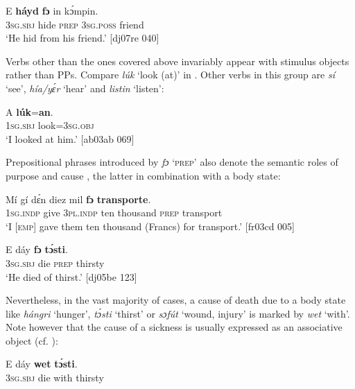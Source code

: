 \ea%
    \label{ex:key:1057}
    \gll E    \textbf{háyd}  \textbf{fɔ} in    kɔ́mpin.\\
\textsc{3sg.sbj}  hide    \textsc{prep}  \textsc{3sg.poss}  friend\\

\glt ‘He hid from his friend.’ [dj07re 040]
\z

Verbs other than the ones covered above invariably appear with stimulus objects rather than PPs. Compare \textit{lúk} ‘look (at)’ in . Other verbs in this group are \textit{sí} ‘see’, \textit{hía/yɛ́r} ‘hear’ and \textit{listin} ‘listen’:


\ea%
    \label{ex:key:1058}
    \gll A    \textbf{lúk}=\textbf{an}.\\
\textsc{1sg.sbj}  look=\textsc{3sg.obj}\\

\glt ‘I looked at him.’ [ab03ab 069]
\z

Prepositional phrases introduced by \textit{fɔ} ‘\textsc{prep}’ also denote the semantic roles of purpose  and cause , the latter in combination with a body state: 


\ea%
    \label{ex:key:1059}
    \gll Mí    gí  dɛ́n    diez  mil      \textbf{fɔ}  \textbf{transporte}.\\
\textsc{1sg.indp}  give  \textsc{3pl.indp}  ten  thousand  \textsc{prep}  transport\\

\glt ‘I \textsc{[emp]} gave them ten thousand (Francs) for transport.’ [fr03cd 005]
\z


\ea
	\label{ex:key:1060}
	\gll  E    dáy  \textbf{fɔ}  \textbf{tɔ́sti}.\\
\textsc{3sg.sbj}  die  \textsc{prep}  thirsty\\

\glt ‘He died of thirst.’ [dj05be 123]
\z

Nevertheless, in the vast majority of cases, a cause of death due to a body state like \textit{hángri} ‘hunger’, \textit{tɔ́sti} ‘thirst’  or \textit{sɔfút} ‘wound, injury’  is marked by \textit{wet} ‘with’. Note however that the cause of a sickness is usually expressed as an associative object (cf. ):


\ea%
    \label{ex:key:1061}
    \gll E    dáy  \textbf{wet}    \textbf{tɔ́sti}.\\
\textsc{3sg.sbj}  die  with    thirsty\\

